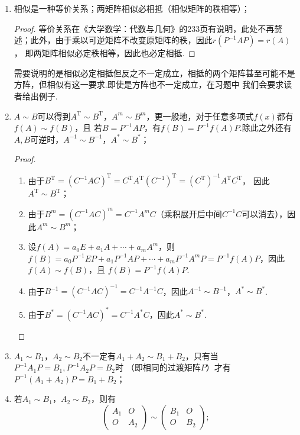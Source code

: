 \begin{enumerate}
    \item 相似是一种等价关系；两矩阵相似必相抵（相似矩阵的秩相等）；

    \begin{proof}
        等价关系在《大学数学：代数与几何》的233页有说明，此处不再赘述；此外，由于乘以可逆矩阵不改变原矩阵的秩，因此$r(P^{-1}AP)=r(A)$，
        即两矩阵相似必定秩相等，因此也必定相抵.
    \end{proof}

    需要说明的是相似必定相抵但反之不一定成立，相抵的两个矩阵甚至可能不是方阵，但相似有这一要求.即使是方阵也不一定成立，在习题中
    我们会要求读者给出例子.

    \item $A\sim B$可以得到$A^\mathrm{T}\sim B^\mathrm{T}$，$A^m\sim B^m$，更一般地，对于任意多项式$f(x)$都有$f(A)\sim f(B)$，且
    若$B=P^{-1}AP$，有$f(B)=P^{-1}f(A)P$.除此之外还有$A,B$可逆时，$A^{-1}\sim B^{-1}$，$A^*\sim B^*$；

    \begin{proof}
        \begin{enumerate}
            \item 由于$B^\mathrm{T}=(C^{-1}AC)^\mathrm{T}=C^\mathrm{T}A^\mathrm{T}(C^{-1})^\mathrm{T}=(C^\mathrm{T})^{-1}A^\mathrm{T}C^\mathrm{T}$，
            因此$A^\mathrm{T}\sim B^\mathrm{T}$；
            \item 由于$B^m=(C^{-1}AC)^m=C^{-1}A^mC$（乘积展开后中间$C^{-1}C$可以消去），因此$A^m\sim B^m$；
            \item 设$f(A)=a_0E+a_1A+\cdots+a_mA^m$，则$f(B)=a_0P^{-1}EP+a_1P^{-1}AP+\cdots+a_mP^{-1}A^mP=P^{-1}f(A)P$，因此$f(A)\sim f(B)$，且
            $f(B)=P^{-1}f(A)P$.
            \item 由于$B^{-1}=(C^{-1}AC)^{-1}=C^{-1}A^{-1}C$，因此$A^{-1}\sim B^{-1}$，$A^*\sim B^*$.
            \item 由于$B^*=(C^{-1}AC)^*=C^{-1}A^*C$，因此$A^*\sim B^*$.
        \end{enumerate}
    \end{proof}

    \item $A_1\sim B_1$，$A_2\sim B_2$不一定有$A_1+A_2\sim B_1+B_2$，只有当$P^{-1}A_1P=B_1,P^{-1}A_2P=B_2$时
    （即相同的过渡矩阵$P$）才有$P^{-1}(A_1+A_2)P=B_1+B_2$；

    \item 若$A_1\sim B_1$，$A_2\sim B_2$，则有
    \[ \begin{pmatrix}
        A_1 & O \\ O & A_2
    \end{pmatrix}\sim\begin{pmatrix}
        B_1 & O \\ O & B_2
    \end{pmatrix};\]


\end{enumerate}
